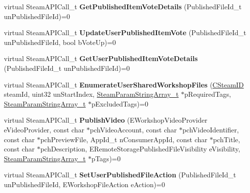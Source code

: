 \begin{DoxyCompactItemize}
\item 
\hypertarget{classISteamRemoteStorage_a73b9d0f4d345279b23083fdbf9cc0e93}{}virtual Steam\+A\+P\+I\+Call\+\_\+t {\bfseries Get\+Published\+Item\+Vote\+Details} (Published\+File\+Id\+\_\+t un\+Published\+File\+Id)=0\label{classISteamRemoteStorage_a73b9d0f4d345279b23083fdbf9cc0e93}

\item 
\hypertarget{classISteamRemoteStorage_a8cda645784600e0455806016fcf6fe65}{}virtual Steam\+A\+P\+I\+Call\+\_\+t {\bfseries Update\+User\+Published\+Item\+Vote} (Published\+File\+Id\+\_\+t un\+Published\+File\+Id, bool b\+Vote\+Up)=0\label{classISteamRemoteStorage_a8cda645784600e0455806016fcf6fe65}

\item 
\hypertarget{classISteamRemoteStorage_a3116f92857932033e876571a96cf6dff}{}virtual Steam\+A\+P\+I\+Call\+\_\+t {\bfseries Get\+User\+Published\+Item\+Vote\+Details} (Published\+File\+Id\+\_\+t un\+Published\+File\+Id)=0\label{classISteamRemoteStorage_a3116f92857932033e876571a96cf6dff}

\item 
\hypertarget{classISteamRemoteStorage_a6a177775a0aae5595cd7d644f8ce29f7}{}virtual Steam\+A\+P\+I\+Call\+\_\+t {\bfseries Enumerate\+User\+Shared\+Workshop\+Files} (\hyperlink{classCSteamID}{C\+Steam\+I\+D} steam\+Id, uint32 un\+Start\+Index, \hyperlink{structSteamParamStringArray__t}{Steam\+Param\+String\+Array\+\_\+t} $\ast$p\+Required\+Tags, \hyperlink{structSteamParamStringArray__t}{Steam\+Param\+String\+Array\+\_\+t} $\ast$p\+Excluded\+Tags)=0\label{classISteamRemoteStorage_a6a177775a0aae5595cd7d644f8ce29f7}

\item 
\hypertarget{classISteamRemoteStorage_ad617bab6e450eaf8e0d127d135dacd44}{}virtual Steam\+A\+P\+I\+Call\+\_\+t {\bfseries Publish\+Video} (E\+Workshop\+Video\+Provider e\+Video\+Provider, const char $\ast$pch\+Video\+Account, const char $\ast$pch\+Video\+Identifier, const char $\ast$pch\+Preview\+File, App\+Id\+\_\+t n\+Consumer\+App\+Id, const char $\ast$pch\+Title, const char $\ast$pch\+Description, E\+Remote\+Storage\+Published\+File\+Visibility e\+Visibility, \hyperlink{structSteamParamStringArray__t}{Steam\+Param\+String\+Array\+\_\+t} $\ast$p\+Tags)=0\label{classISteamRemoteStorage_ad617bab6e450eaf8e0d127d135dacd44}

\item 
\hypertarget{classISteamRemoteStorage_aeb1277cf882e174579cb04882cad9cad}{}virtual Steam\+A\+P\+I\+Call\+\_\+t {\bfseries Set\+User\+Published\+File\+Action} (Published\+File\+Id\+\_\+t un\+Published\+File\+Id, E\+Workshop\+File\+Action e\+Action)=0\label{classISteamRemoteStorage_aeb1277cf882e174579cb04882cad9cad}


\end{DoxyCompactItemize}
